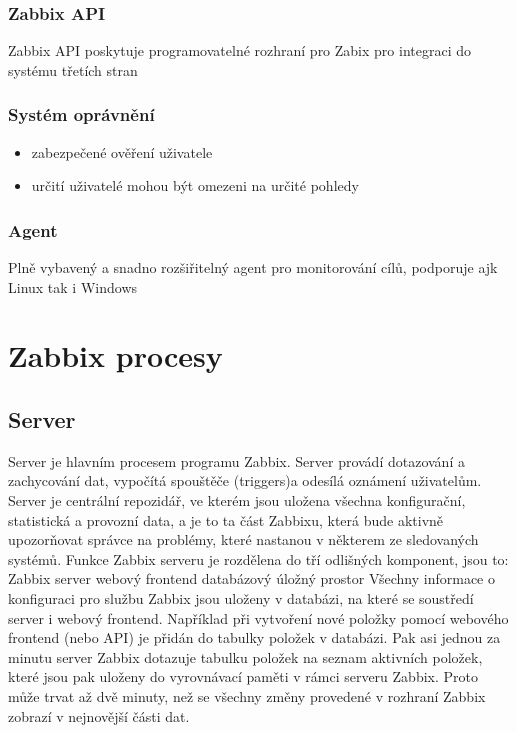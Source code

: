 \documentclass{article}
\begin{document}
\subsubsection{Zabbix API}
Zabbix API poskytuje programovatelné rozhraní pro Zabix pro integraci do systému třetích stran
\subsubsection{Systém oprávnění}
\begin{itemize}
    \item zabezpečené ověření uživatele
    \item určití uživatelé mohou být omezeni na určité pohledy
\end{itemize}
\subsubsection{Agent}
Plně vybavený a snadno rozšiřitelný agent pro monitorování cílů, podporuje ajk Linux tak i Windows
\section{Zabbix procesy}
\subsection{Server}
Server je hlavním procesem programu Zabbix.
Server provádí dotazování a zachycování dat, vypočítá spouštěče (triggers)a odesílá oznámení uživatelům. Server je centrální repozidář, ve kterém jsou uložena všechna konfigurační, statistická a provozní data, a je to ta část Zabbixu, která bude aktivně upozorňovat správce na problémy, které nastanou v některem ze sledovaných systémů.
Funkce Zabbix serveru je rozdělena do tří odlišných komponent, jsou to:\newline
Zabbix server\newline
webový frontend\newline
databázový úložný prostor\newline
Všechny informace o konfiguraci pro službu Zabbix jsou uloženy v databázi, na které se soustředí server i webový frontend. Například při vytvoření nové položky pomocí webového frontend (nebo API) je přidán do tabulky položek v databázi. Pak asi jednou za minutu server Zabbix dotazuje tabulku položek na seznam aktivních položek, které jsou pak uloženy do vyrovnávací paměti v rámci serveru Zabbix. Proto může trvat až dvě minuty, než se všechny změny provedené v rozhraní Zabbix zobrazí v nejnovější části dat.
\end{document}

